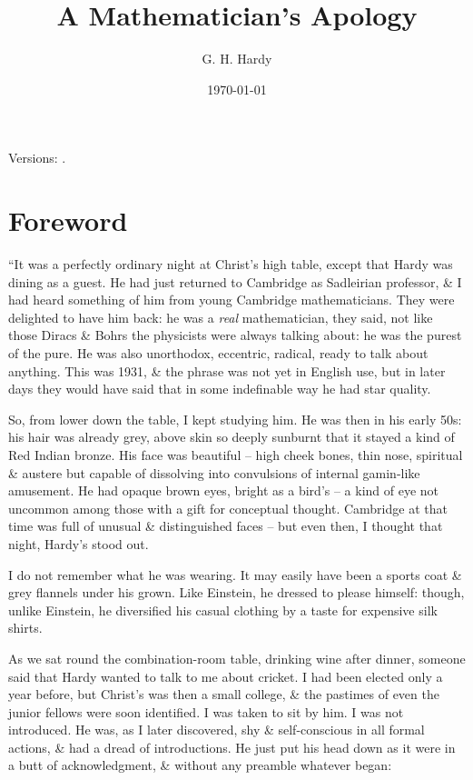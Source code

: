 \documentclass{article}
\title{A Mathematician's Apology}
\author{G. H. Hardy}
\date{\today}
\numberwithin{equation}{section}
\begin{document}
\maketitle
\textsf{Versions:} \cite{Hardy1940, Hardy1992, Hardy2022}.
\tableofcontents


\section{Foreword}
``It was a perfectly ordinary night at Christ's high table, except that Hardy was dining as a guest. He had just returned to Cambridge as Sadleirian professor, \& I had heard something of him from young Cambridge mathematicians. They were delighted to have him back: he was a \textit{real} mathematician, they said, not like those Diracs \& Bohrs the physicists were always talking about: he was the purest of the pure. He was also unorthodox, eccentric, radical, ready to talk about anything. This was 1931, \& the phrase was not yet in English use, but in later days they would have said that in some indefinable way he had star quality.

So, from lower down the table, I kept studying him. He was then in his early 50s: his hair was already grey, above skin so deeply sunburnt that it stayed a kind of Red Indian bronze. His face was beautiful -- high cheek bones, thin nose, spiritual \& austere but capable of dissolving into convulsions of internal gamin-like amusement. He had opaque brown eyes, bright as a bird's -- a kind of eye not uncommon among those with a gift for conceptual thought. Cambridge at that time was full of unusual \& distinguished faces -- but even then, I thought that night, Hardy's stood out.

I do not remember what he was wearing. It may easily have been a sports coat \& grey flannels under his grown. Like Einstein, he dressed to please himself: though, unlike Einstein, he diversified his casual clothing by a taste for expensive silk shirts.

As we sat round the combination-room table, drinking wine after dinner, someone said that Hardy wanted to talk to me about cricket. I had been elected only a year before, but Christ's was then a small college, \& the pastimes of even the junior fellows were soon identified. I was taken to sit by him. I was not introduced. He was, as I later discovered, shy \& self-conscious in all formal actions, \& had a dread of introductions. He just put his head down as it were in a butt of acknowledgment, \& without any preamble whatever began:
\end{document}
